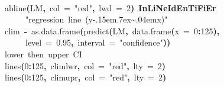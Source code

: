 \documentclass[a4paper]{article}
\newcommand{\hlnumber}[1]{\textcolor[rgb]{0.0823529411764706,0.0784313725490196,0.709803921568627}{#1}}%
\newcommand{\hlfunctioncall}[1]{\textcolor[rgb]{1,0,0}{#1}}%
\newcommand{\hlstring}[1]{\textcolor[rgb]{0.6,0.6,1}{#1}}%
\newcommand{\hlkeyword}[1]{\textcolor[rgb]{0,0,0}{\textbf{#1}}}%
\newcommand{\hlargument}[1]{\textcolor[rgb]{0.694117647058824,0.247058823529412,0.0196078431372549}{#1}}%
\newcommand{\hlcomment}[1]{\textcolor[rgb]{0.8,0.8,0.8}{#1}}%
\newcommand{\hlassignement}[1]{\textcolor[rgb]{0.215686274509804,0.215686274509804,0.384313725490196}{\textbf{#1}}}%
\newcommand{\hlsymbol}[1]{\textcolor[rgb]{0,0,0}{#1}}%
\newcommand{\hlprompt}[1]{\textcolor[rgb]{0,0,0}{#1}}%
\def\urltilda{\kern -.15em\lower .7ex\hbox{\~{}}\kern .04em}%
\newcommand{\hlstd}[1]{\textcolor[rgb]{0,0,0}{#1}}%
\newenvironment{Houtput}{\raggedright}{%
%
}
\begin{document}
\begin{Houtput}
\normalfont
\hspace*{\fill}\\
\hlstd{}\ttfamily\noindent
\hlprompt{\usebox{\hlnormalsizeboxgreaterthan}{\ }}\hlfunctioncall{abline}\hlkeyword{(}\hlsymbol{LM}\hlkeyword{,}{\ }\hlargument{col}{\ }\hlargument{=}{\ }\hlstring{"red"}\hlkeyword{,}{\ }\hlargument{lwd}{\ }\hlargument{=}{\ }\hlnumber{2}\hlkeyword{)}{\ }\hlkeyword{\usebox{\hlnormalsizeboxpercent}InLiNe\usebox{\hlnormalsizeboxunderscore}IdEnTiFiEr\usebox{\hlnormalsizeboxpercent}}\hspace*{\fill}\\
\hlstd{}\hlprompt{{\ }}{\ }{\ }{\ }{\ }\hlstring{"\usebox{\hlnormalsizeboxhash}{\ }regression{\ }line{\ }(y\urltilda{}x)"}\mbox{}
\normalfont
\hspace*{\fill}\\
\hlstd{}\ttfamily\noindent
\hlprompt{\usebox{\hlnormalsizeboxgreaterthan}{\ }}\hlsymbol{clim}{\ }\hlassignement{\usebox{\hlnormalsizeboxlessthan}-}{\ }\hlfunctioncall{as.data.frame}\hlkeyword{(}\hlfunctioncall{predict}\hlkeyword{(}\hlsymbol{LM}\hlkeyword{,}{\ }\hlfunctioncall{data.frame}\hlkeyword{(}\hlargument{x}{\ }\hlargument{=}{\ }\hlnumber{0}\hlkeyword{:}\hlnumber{125}\hlkeyword{)}\hlkeyword{,}\hspace*{\fill}\\
\hlstd{}\hlprompt{{\ }}{\ }{\ }{\ }{\ }\hlargument{level}{\ }\hlargument{=}{\ }\hlnumber{0.95}\hlkeyword{,}{\ }\hlargument{interval}{\ }\hlargument{=}{\ }\hlstring{"confidence"}\hlkeyword{)}\hlkeyword{)}\mbox{}
\normalfont
\hspace*{\fill}\\
\hlstd{}\ttfamily\noindent
\hlprompt{\usebox{\hlnormalsizeboxgreaterthan}{\ }}\hlcomment{\usebox{\hlnormalsizeboxhash}{\ }lower{\ }then{\ }upper{\ }CI}\mbox{}
\normalfont
\hspace*{\fill}\\
\hlstd{}\ttfamily\noindent
\hlprompt{\usebox{\hlnormalsizeboxgreaterthan}{\ }}\hlfunctioncall{lines}\hlkeyword{(}\hlnumber{0}\hlkeyword{:}\hlnumber{125}\hlkeyword{,}{\ }\hlsymbol{clim}\hlkeyword{\usebox{\hlnormalsizeboxdollar}}\hlsymbol{lwr}\hlkeyword{,}{\ }\hlargument{col}{\ }\hlargument{=}{\ }\hlstring{"red"}\hlkeyword{,}{\ }\hlargument{lty}{\ }\hlargument{=}{\ }\hlnumber{2}\hlkeyword{)}\mbox{}
\normalfont
\hspace*{\fill}\\
\hlstd{}\ttfamily\noindent
\hlprompt{\usebox{\hlnormalsizeboxgreaterthan}{\ }}\hlfunctioncall{lines}\hlkeyword{(}\hlnumber{0}\hlkeyword{:}\hlnumber{125}\hlkeyword{,}{\ }\hlsymbol{clim}\hlkeyword{\usebox{\hlnormalsizeboxdollar}}\hlsymbol{upr}\hlkeyword{,}{\ }\hlargument{col}{\ }\hlargument{=}{\ }\hlstring{"red"}\hlkeyword{,}{\ }\hlargument{lty}{\ }\hlargument{=}{\ }\hlnumber{2}\hlkeyword{)}\mbox{}
\normalfont
\hspace*{\fill}\\
\hlstd{}
\end{Houtput}
\end{document}
